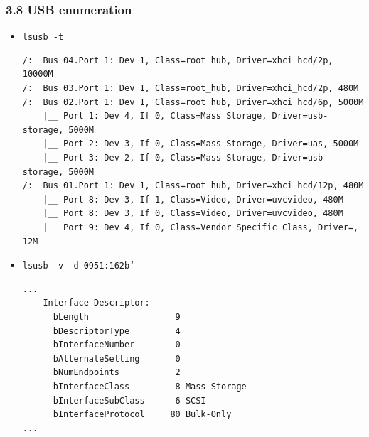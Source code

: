 \begin{frame}[fragile]
	\frametitle{3.8 USB enumeration}
    \begin{itemize}
        \item[] \texttt{lsusb -t}
\begin{lstlisting}[basicstyle=\tiny]
/:  Bus 04.Port 1: Dev 1, Class=root_hub, Driver=xhci_hcd/2p, 10000M
/:  Bus 03.Port 1: Dev 1, Class=root_hub, Driver=xhci_hcd/2p, 480M
/:  Bus 02.Port 1: Dev 1, Class=root_hub, Driver=xhci_hcd/6p, 5000M
    |__ Port 1: Dev 4, If 0, Class=Mass Storage, Driver=usb-storage, 5000M
    |__ Port 2: Dev 3, If 0, Class=Mass Storage, Driver=uas, 5000M
    |__ Port 3: Dev 2, If 0, Class=Mass Storage, Driver=usb-storage, 5000M
/:  Bus 01.Port 1: Dev 1, Class=root_hub, Driver=xhci_hcd/12p, 480M
    |__ Port 8: Dev 3, If 1, Class=Video, Driver=uvcvideo, 480M
    |__ Port 8: Dev 3, If 0, Class=Video, Driver=uvcvideo, 480M
    |__ Port 9: Dev 4, If 0, Class=Vendor Specific Class, Driver=, 12M
\end{lstlisting}
        \item[] \texttt{lsusb  -v -d 0951:162b`}
\begin{lstlisting}[basicstyle=\tiny]
...
    Interface Descriptor:
      bLength                 9
      bDescriptorType         4
      bInterfaceNumber        0
      bAlternateSetting       0
      bNumEndpoints           2
      bInterfaceClass         8 Mass Storage
      bInterfaceSubClass      6 SCSI
      bInterfaceProtocol     80 Bulk-Only
...
\end{lstlisting}
    \end{itemize}
\end{frame}


